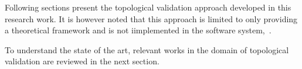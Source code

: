 Following sections present the topological validation approach developed in this research work. It is however noted that this approach is limited to only providing a theoretical framework and is not iimplemented in the software system,~\mysystemname.%

To understand the state of the art, relevant works in the domain of topological validation are reviewed in the next section.




